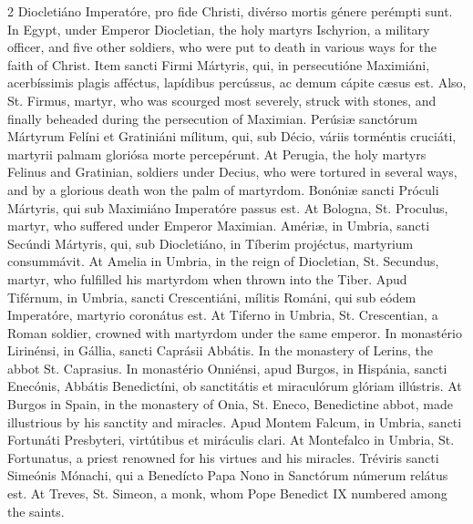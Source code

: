 \begin{paracol}{2}
 Diocletiáno Imperatóre, pro fide Christi, divérso mortis génere perémpti 
 sunt.
\switchcolumn
{}
In Egypt, under Emperor Diocletian, 
 the holy martyrs Ischyrion, a military officer, and five other soldiers, who 
 were put to death in various ways for the faith of Christ.
\switchcolumn*
{}
Item sancti Firmi 
 Mártyris, qui, in persecutióne Maximiáni, acerbíssimis plagis afféctus, 
 lapídibus percússus, ac demum cápite cæsus est.
\switchcolumn
{}
Also, St. Firmus, martyr, who was 
 scourged most severely, struck with stones, and finally beheaded during the 
 persecution of Maximian.
\switchcolumn*
{}
Perúsiæ sanctórum 
 Mártyrum Felíni et Gratiniáni mílitum, qui, sub Décio, váriis torméntis 
 cruciáti, martyrii palmam gloriósa morte percepérunt.
\switchcolumn
{}
At Perugia, the holy martyrs 
 Felinus and Gratinian, soldiers under Decius, who were tortured in several 
 ways, and by a glorious death won the palm of martyrdom.
\switchcolumn*
{}
Bonóniæ sancti Próculi 
 Mártyris, qui sub Maximiáno Imperatóre passus est.
\switchcolumn
{}
At Bologna, St. Proculus, martyr, 
 who suffered under Emperor Maximian.
\switchcolumn*
{}
Amériæ, in Umbria, 
 sancti Secúndi Mártyris, qui, sub Diocletiáno, in Tíberim projéctus, 
 martyrium consummávit.
\switchcolumn
{}
At Amelia in Umbria, in the reign 
 of Diocletian, St. Secundus, martyr, who fulfilled his martyrdom when thrown 
 into the Tiber.
\switchcolumn*
{}
Apud Tiférnum, in 
 Umbria, sancti Crescentiáni, mílitis Románi, qui sub eódem Imperatóre, 
 martyrio coronátus est.
\switchcolumn
{}
At Tiferno in Umbria, St. 
 Crescentian, a Roman soldier, crowned with martyrdom under the same emperor.
\switchcolumn*
{}
In monastério 
 Lirinénsi, in Gállia, sancti Caprásii Abbátis.
\switchcolumn
{}
In the monastery of Lerins, the 
 abbot St. Caprasius.
\switchcolumn*
{}
In monastério Onniénsi, 
 apud Burgos, in Hispánia, sancti Enecónis, Abbátis Benedictíni, ob 
 sanctitátis et miraculórum glóriam illústris.
\switchcolumn
{}
At Burgos in Spain, in the 
 monastery of Onia, St. Eneco, Benedictine abbot, made illustrious by his 
 sanctity and miracles.
\switchcolumn*
{}
Apud Montem Falcum, in 
 Umbria, sancti Fortunáti Presbyteri, virtútibus et miráculis clari.
\switchcolumn
{}
At Montefalco in Umbria, St. 
 Fortunatus, a priest renowned for his virtues and his miracles.
\switchcolumn*
{}
Tréviris sancti 
 Simeónis Mónachi, qui a Benedícto Papa Nono in Sanctórum númerum relátus 
 est.
\switchcolumn
{}
At Treves, St. Simeon, a monk, whom 
 Pope Benedict IX numbered among the saints.
\switchcolumn*
{}
\end{paracol}

